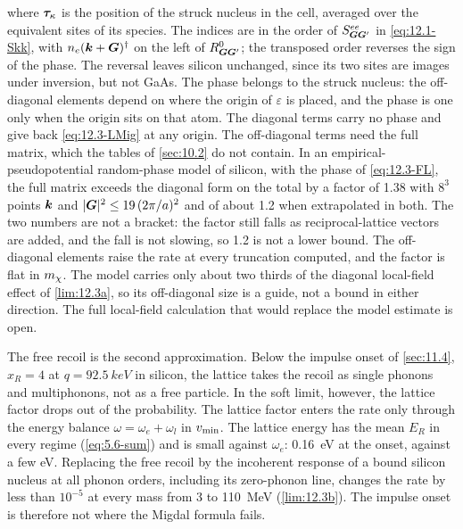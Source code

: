 where $\bm{\tau}_\kappa$ is the position of the struck nucleus in the cell, averaged over the equivalent sites of its species. The indices are in the order of $S^{ee}_{\bm{G}\bm{G}'}$ in \cref{eq:12.1-Skk}, with $n_e(\bm{k}+\bm{G})^\dagger$ on the left of $R^0_{\bm{G}\bm{G}'}$; the transposed order reverses the sign of the phase. The reversal leaves silicon unchanged, since its two sites are images under inversion, but not GaAs. The phase belongs to the struck nucleus: the off-diagonal elements depend on where the origin of $\varepsilon$ is placed, and the phase is one only when the origin sits on that atom. The diagonal terms carry no phase and give back \cref{eq:12.3-LMig} at any origin. The off-diagonal terms need the full matrix, which the tables of \cref{sec:10.2} do not contain. In an empirical-pseudopotential random-phase model of silicon, with the phase of \cref{eq:12.3-FL}, the full matrix exceeds the diagonal form on the total by a factor of 1.38 with $8^3$ points $\bm{k}$ and $|\bm{G}|^2 \le 19\,(2\pi/a)^2$ and of about 1.2 when extrapolated in both. The two numbers are not a bracket: the factor still falls as reciprocal-lattice vectors are added, and the fall is not slowing, so 1.2 is not a lower bound. The off-diagonal elements raise the rate at every truncation computed, and the factor is flat in $m_{\chi}$. The model carries only about two thirds of the diagonal local-field effect of \cref{lim:12.3a}, so its off-diagonal size is a guide, not a bound in either direction. The full local-field calculation that would replace the model estimate is open.

The free recoil is the second approximation. Below the impulse onset of \cref{sec:11.4}, $x_R = 4$ at $q = \SI{92.5}{keV}$ in silicon, the lattice takes the recoil as single phonons and multiphonons, not as a free particle. In the soft limit, however, the lattice factor drops out of the probability. The lattice factor enters the rate only through the energy balance $\omega = \omega_e + \omega_l$ in $v_{\mathrm{min}}$. The lattice energy has the mean $E_R$ in every regime (\cref{eq:5.6-sum}) and is small against $\omega_e$: \SI{0.16}{eV} at the onset, against a few eV. Replacing the free recoil by the incoherent response of a bound silicon nucleus at all phonon orders, including its zero-phonon line, changes the rate by less than $10^{-5}$ at every mass from 3 to \SI{110}{MeV} (\cref{lim:12.3b}). The impulse onset is therefore not where the Migdal formula fails.

